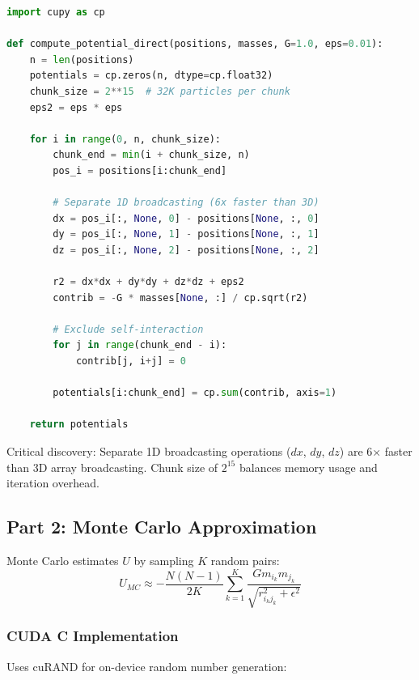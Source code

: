 \documentclass[11pt,a4paper]{article}
\begin{document}
\begin{lstlisting}[language=Python, caption={CuPy Direct Summation with batching}, label={lst:cupy_direct}]
import cupy as cp

def compute_potential_direct(positions, masses, G=1.0, eps=0.01):
    n = len(positions)
    potentials = cp.zeros(n, dtype=cp.float32)
    chunk_size = 2**15  # 32K particles per chunk
    eps2 = eps * eps

    for i in range(0, n, chunk_size):
        chunk_end = min(i + chunk_size, n)
        pos_i = positions[i:chunk_end]

        # Separate 1D broadcasting (6x faster than 3D)
        dx = pos_i[:, None, 0] - positions[None, :, 0]
        dy = pos_i[:, None, 1] - positions[None, :, 1]
        dz = pos_i[:, None, 2] - positions[None, :, 2]

        r2 = dx*dx + dy*dy + dz*dz + eps2
        contrib = -G * masses[None, :] / cp.sqrt(r2)

        # Exclude self-interaction
        for j in range(chunk_end - i):
            contrib[j, i+j] = 0

        potentials[i:chunk_end] = cp.sum(contrib, axis=1)

    return potentials
\end{lstlisting}

Critical discovery: Separate 1D broadcasting operations ($dx$, $dy$, $dz$) are 6× faster than 3D array broadcasting. Chunk size of $2^{15}$ balances memory usage and iteration overhead.

\subsection{Part 2: Monte Carlo Approximation}

Monte Carlo estimates $U$ by sampling $K$ random pairs:
\begin{equation}\label{eq:mc_estimator}
U_{MC} \approx -\frac{N(N-1)}{2K} \sum_{k=1}^{K} \frac{G m_{i_k} m_{j_k}}{\sqrt{r_{i_k j_k}^2 + \epsilon^2}}
\end{equation}

\subsubsection{CUDA C Implementation}

Uses cuRAND for on-device random number generation:
\end{document}
